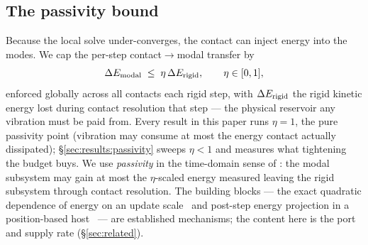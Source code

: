 \subsection{The passivity bound}
\label{sec:method:passivity}
Because the local solve under-converges, the contact can inject energy into the
modes. We cap the per-step contact$\to$modal transfer by
\begin{equation}
  \Delta E_{\mathrm{modal}} \;\le\; \eta\,\Delta E_{\mathrm{rigid}} , \qquad \eta\in[0,1],
  \label{eq:passivity}
\end{equation}
enforced globally across all contacts each rigid step, with
$\Delta E_{\mathrm{rigid}}$ the rigid kinetic energy lost during contact resolution that step ---
the physical reservoir any vibration must be paid from. Every result in this
paper runs $\eta=1$, the pure passivity point (vibration may consume at most
the energy contact actually dissipated); \S\ref{sec:results:passivity} sweeps
$\eta<1$ and measures what tightening the budget buys. We use
\emph{passivity} in the time-domain sense of \citet{hannaford2002}: the modal
subsystem may gain at most the $\eta$-scaled energy measured leaving the rigid
subsystem through contact resolution. The building blocks --- the exact
quadratic dependence of energy on an update scale~\citep{su2009energy,
you2026energy} and post-step energy projection in a position-based
host~\citep{dinev2018fepr} --- are established mechanisms; the content here is
the port and supply rate (\S\ref{sec:related}).

